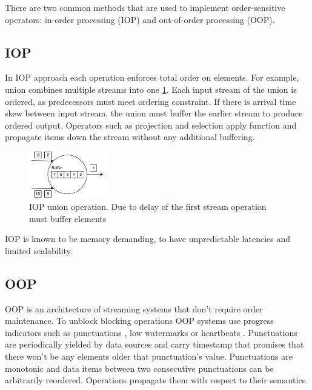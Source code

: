 
\label {fs-typical}

There are two common methods that are used to implement order-sensitive operators: in-order processing (IOP) \cite{Arasu:2006:CCQ:1146461.1146463} \cite{Cranor:2003:GSD:872757.872838} \cite{hammad2004optimizing} and out-of-order processing (OOP)\cite{Li:2008:OPN:1453856.1453890}.

\subsection{IOP}

In IOP approach each operation enforces total order on elements. For example, union combines multiple streams into one \ref{iop}. Each input stream of the union is ordered, as predecessors must meet ordering constraint. If there is arrival time skew between input stream, the union must buffer the earlier stream to produce ordered output. Operators such as projection and selection apply function and propagate items down the stream without any additional buffering.

\begin{figure}[htbp]
  \centering
  \includegraphics[width=0.30\textwidth]{pics/iop}
  \caption{IOP union operation. Due to delay of the first stream operation must buffer elements}
  \label {iop}
\end{figure}

IOP is known to be memory demanding, to have unpredictable latencies and limited scalability.\cite{Li:2008:OPN:1453856.1453890}

\subsection{OOP}

OOP is an architecture of streaming systems that don't require order maintenance. To unblock blocking operations OOP systems use progress indicators such as punctuations \cite{Tucker:2003:EPS:776752.776780}, low watermarks \cite{Akidau:2013:MFS:2536222.2536229} or heartbeats \cite{Srivastava:2004:FTM:1055558.1055596}. Punctuations are periodically yielded by data sources and carry timestamp that promises that there won't be any elements older that punctuation's value. Punctuations are monotonic and data items between two consecutive punctuations can be arbitrarily reordered. Operations propagate them with respect to their semantics.

